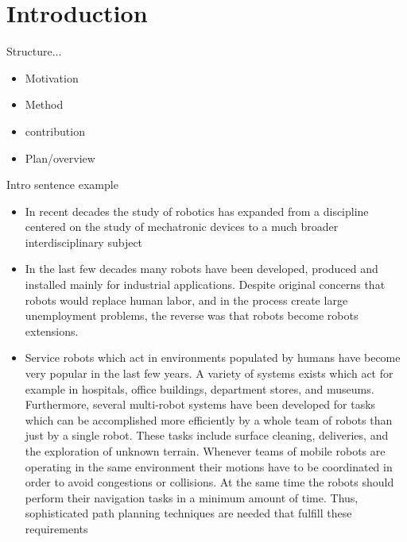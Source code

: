 \chapter*{Introduction}

Structure...
\begin{itemize}
    \item Motivation
    \item Method
    \item contribution
    \item Plan/overview
\end{itemize}

Intro sentence example
\begin{itemize}
    \item In recent decades the study of robotics has expanded from a discipline centered on the study of mechatronic devices to a much broader interdisciplinary subject
    \item In the last few decades many robots have been developed, produced and installed mainly for industrial applications. Despite original concerns that robots would replace human labor, and in the process create large unemployment problems, the reverse was that robots become robots extensions.
    \item Service robots which act in environments populated by humans have become very popular in the last few years. A variety of systems exists which act for example in hospitals, office buildings, department stores, and museums. Furthermore, several multi-robot systems have been developed for tasks which can be accomplished more efficiently by a whole team of robots than just by a single robot.  These tasks include surface cleaning, deliveries, and the exploration of unknown terrain. Whenever teams of mobile robots are operating in the same environment their motions have to be coordinated in order to avoid congestions or collisions.  At the same time the robots should perform their navigation tasks in a minimum amount of time. Thus, sophisticated path planning techniques are needed that fulfill these requirements
\end{itemize}

